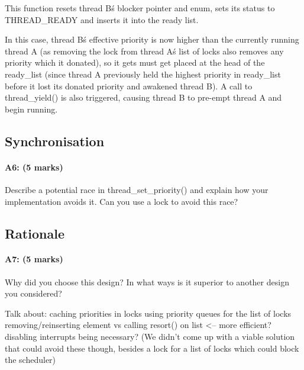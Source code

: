 This function resets thread B\'s blocker pointer and enum, sets its status to THREAD\_READY and inserts it into the ready list.

In this case, thread B\'s effective priority is now higher than the currently running thread A (as removing the lock from thread A\'s list of locks also removes any priority which it donated), so it gets must get placed at the head of the ready\_list (since thread A previously held the highest priority in ready\_list before it lost its donated priority and awakened thread B). A call to thread\_yield() is also triggered, causing thread B to pre-empt thread A and begin running.

\subsection{Synchronisation}
\paragraph{A6: (5 marks)}
Describe a potential race in thread\_set\_priority() and explain how your implementation avoids it.  Can you use a lock to avoid this race?

\subsection{Rationale}
\paragraph{A7: (5 marks)}
Why did you choose this design?  In what ways is it superior to another design you considered?

Talk about:
	caching priorities in locks
	using priority queues for the list of locks
  removing/reinserting element vs calling resort() on list <-- more efficient?
	disabling interrupts being necessary? (We didn't come up with a viable solution that could avoid these though, besides a lock for a list of locks which could block the scheduler)
